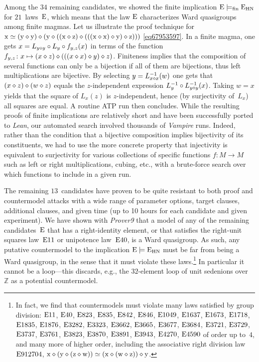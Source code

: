 Among the $34$ remaining candidates, we showed the finite implication $\mathrm{E}\models_{\mathrm{fin}}\mathrm{E}_{\mathrm{HN}}$ for $21$~laws~$\mathrm{E}$, which means that the law $\mathrm{E}$ characterizes Ward quasigroups among finite magmas.  Let us illustrate the proof technique for $\mathrm{x} \simeq (\mathrm{y} \diamond \mathrm{y}) \diamond (\mathrm{y} \diamond ((\mathrm{x} \diamond \mathrm{z}) \diamond (((\mathrm{x} \diamond \mathrm{x}) \diamond \mathrm{y}) \diamond \mathrm{z})))$ \eqref{eq67953597}.  In a finite magma, one gets $x = L_{y\diamond y} \circ L_y \circ f_{y,z}(x)$ in terms of the function $f_{y,z}\colon x \mapsto (x\diamond z) \diamond (((x \diamond x) \diamond y) \diamond z)$.  Finiteness implies that the composition of several functions can only be a bijection if all of them are bijections, thus left multiplications are bijective.  By selecting $y=L_{x\diamond x}^{-1}(w)$ one gets that $(x\diamond z)\diamond (w\diamond z)$ equals the $z$-independent expression $L_y^{-1} \circ L_{y\diamond y}^{-1}(x)$.  Taking $w=x$ yields that the square of $L_x(z)$ is $z$-independent, hence (by surjectivity of~$L_x$) all squares are equal.  A routine ATP run then concludes.
While the resulting proofs of finite implications are relatively short and have been successfully ported to \emph{Lean}, our automated search involved thousands of \emph{Vampire} runs.
Indeed, rather than the condition that a bijective composition implies bijectivity of its constituents, we had to use the more concrete property that injectivity is equivalent to surjectivity for various collections of specific functions $f\colon M\to M$ such as left or right multiplications, cubing, etc.\@, with a brute-force search over which functions to include in a given run.

The remaining $13$~candidates have proven to be quite resistant to both proof and countermodel attacks with a wide range of parameter options, target clauses, additional clauses, and given time (up to 10 hours for each candidate and given experiment).  We have shown with \emph{Prover9} that a model of any of the remaining candidates~$\mathrm{E}$ that has a right-identity element, or that satisfies the right-unit squares law~$\mathrm{E}11$ or unipotence law~$\mathrm{E}40$, is a Ward quasigroup.  As such, any putative countermodel to the implication $\mathrm{E}\models\mathrm{E}_{\mathrm{HN}}$ must be far from being a Ward quasigroup, in the sense that it must violate these laws.\footnote{In fact, we find that countermodels must violate many laws satisfied by group division: $\mathrm{E}11$, $\mathrm{E}40$, $\mathrm{E}823$, $\mathrm{E}835$, $\mathrm{E}842$, $\mathrm{E}846$, $\mathrm{E}1049$, $\mathrm{E}1637$, $\mathrm{E}1673$, $\mathrm{E}1718$, $\mathrm{E}1835$, $\mathrm{E}1876$, $\mathrm{E}3282$, $\mathrm{E}3323$, $\mathrm{E}3662$, $\mathrm{E}3665$, $\mathrm{E}3677$, $\mathrm{E}3684$, $\mathrm{E}3721$, $\mathrm{E}3729$, $\mathrm{E}3737$, $\mathrm{E}3761$, $\mathrm{E}3823$, $\mathrm{E}3870$, $\mathrm{E}3891$, $\mathrm{E}3943$, $\mathrm{E}4270$, $\mathrm{E}4590$ of order up to~$4$, and many more of higher order, including the associative right division law $\mathrm{E}912704$, $\mathrm{x}\diamond(\mathrm{y}\diamond(\mathrm{z}\diamond\mathrm{w})) \simeq(\mathrm{x}\diamond(\mathrm{w}\diamond\mathrm{z}))\diamond\mathrm{y}$.}  In particular it cannot be a loop---this discards, e.g., the $32$-element loop of unit sedenions over~$\mathbb{Z}$ as a potential countermodel.

